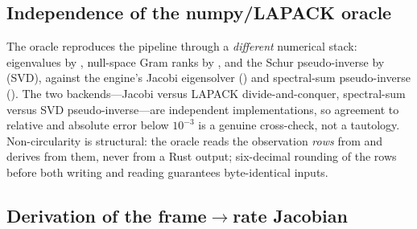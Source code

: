 \subsection{Independence of the numpy/LAPACK oracle}
\label{app:oracle}

The oracle  reproduces the pipeline through a
\emph{different} numerical stack: eigenvalues by , null-space Gram
ranks by , and the Schur pseudo-inverse by  (SVD),
against the engine's Jacobi eigensolver () and spectral-sum pseudo-inverse
(). The two backends---Jacobi versus LAPACK divide-and-conquer, spectral-sum
versus SVD pseudo-inverse---are independent implementations, so agreement to relative and
absolute error below $10^{-3}$ is a genuine cross-check, not a tautology. Non-circularity is
structural: the oracle reads the observation \emph{rows} from  and derives
 from them, never from a Rust output; six-decimal rounding of the rows
before both writing and reading guarantees byte-identical inputs.

\subsection{Derivation of the frame\texorpdfstring{$\to$}{->}rate Jacobian}
\label{app:jacobian}

